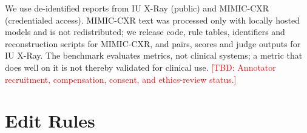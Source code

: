 \documentclass[11pt]{article}
\newcommand{\tbd}[1]{\textcolor{red}{[TBD: #1]}}
\begin{document}
We use de-identified reports from IU X-Ray (public) and MIMIC-CXR (credentialed access). MIMIC-CXR text was processed only with locally hosted models and is not redistributed; we release code, rule tables, identifiers and reconstruction scripts for MIMIC-CXR, and pairs, scores and judge outputs for IU X-Ray. The benchmark evaluates metrics, not clinical systems; a metric that does well on it is not thereby validated for clinical use. \tbd{Annotator recruitment, compensation, consent, and ethics-review status.}



\clearpage
\appendix

\section{Edit Rules}
\label{app:rules}
\end{document}

